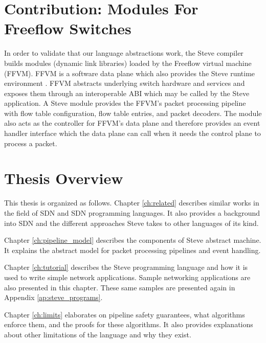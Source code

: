 
\section{Contribution: Modules For Freeflow Switches}

In order to validate that our language abstractions work, the Steve compiler builds modules (dynamic link libraries)
loaded by the Freeflow virtual machine (FFVM). 
FFVM is a software data plane which also provides the Steve runtime environment \cite{freeflow_software}.
FFVM abstracts underlying switch
hardware and services and exposes them through an interoperable ABI which may be called by the Steve application.
A Steve module provides the FFVM's packet processing pipeline with
flow table configuration, flow table entries, and packet decoders.
The module also acts as the controller for FFVM's data plane and therefore provides an event handler interface which the data plane can call when it needs the control plane to process a packet.

\section{Thesis Overview}

This thesis is organized as follows. Chapter \ref{ch:related} describes similar
works in the field of SDN and SDN programming languages. It also provides a
background into SDN and the different approaches Steve takes to other languages
of its kind.

Chapter \ref{ch:pipeline_model} describes the components of Steve abstract machine. It explains the abstract model for packet processing pipelines and event handling.

Chapter \ref{ch:tutorial} describes the Steve programming language and how it is used to write simple network applications.
Sample networking applications are also presented in
this chapter. These same samples are presented again in Appendix
\ref{ap:steve_programs}.

Chapter \ref{ch:limits} elaborates on pipeline safety guarantees, what algorithms enforce them, and the proofs for these algorithms. It also provides explanations about other 
limitations of the language and why they exist.

